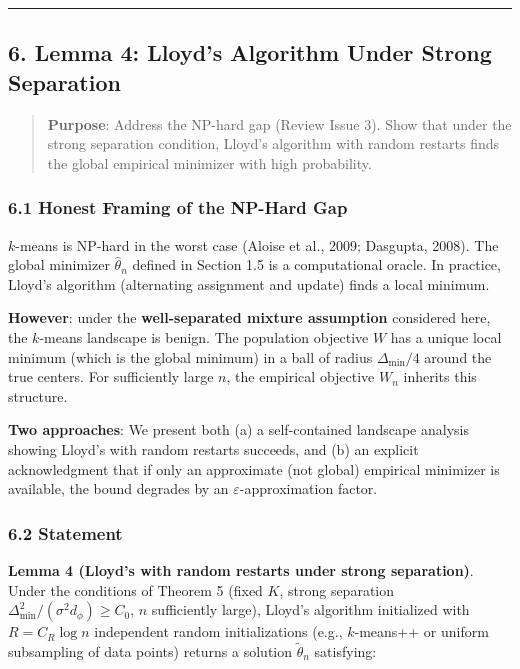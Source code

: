\documentclass[
  12pt,
]{ctexart}
\begin{document}
\begin{center}\rule{0.5\linewidth}{0.5pt}\end{center}

\subsection{6. Lemma 4: Lloyd's Algorithm Under Strong
Separation}\label{lemma-4-lloyds-algorithm-under-strong-separation}

\begin{quote}
\textbf{Purpose}: Address the NP-hard gap (Review Issue 3). Show that
under the strong separation condition, Lloyd's algorithm with random
restarts finds the global empirical minimizer with high probability.
\end{quote}

\subsubsection{6.1 Honest Framing of the NP-Hard
Gap}\label{honest-framing-of-the-np-hard-gap}

\(k\)-means is NP-hard in the worst case (Aloise et al., 2009; Dasgupta,
2008). The global minimizer \(\hat{\theta}_n\) defined in Section 1.5 is
a computational oracle. In practice, Lloyd's algorithm (alternating
assignment and update) finds a local minimum.

\textbf{However}: under the \textbf{well-separated mixture assumption}
considered here, the \(k\)-means landscape is benign. The population
objective \(W\) has a unique local minimum (which is the global minimum)
in a ball of radius \(\Delta_{\min}/4\) around the true centers. For
sufficiently large \(n\), the empirical objective \(W_n\) inherits this
structure.

\textbf{Two approaches}: We present both (a) a self-contained landscape
analysis showing Lloyd's with random restarts succeeds, and (b) an
explicit acknowledgment that if only an approximate (not global)
empirical minimizer is available, the bound degrades by an
\(\varepsilon\)-approximation factor.

\subsubsection{6.2 Statement}\label{statement-3}

\textbf{Lemma 4 (Lloyd's with random restarts under strong separation)}.
Under the conditions of Theorem 5 (fixed \(K\), strong separation
\(\Delta_{\min}^2 / (\sigma^2 d_\phi) \geq C_0\), \(n\) sufficiently
large), Lloyd's algorithm initialized with \(R = C_R \log n\)
independent random initializations (e.g., \(k\)-means++ or uniform
subsampling of data points) returns a solution \(\tilde{\theta}_n\)
satisfying:
\end{document}
